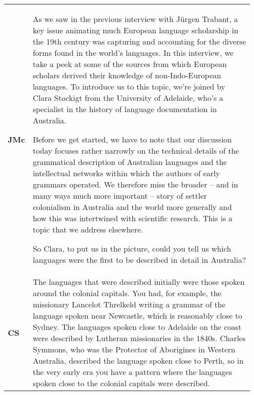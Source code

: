 \documentclass[12pt]{article}
\begin{document}
\begin{flushleft}
\tablefirsthead{}
\tablehead{}
\tabletail{}
\tablelasttail{}
\begin{supertabular}{m{0.24415985in}m{5.89766in}}
\textbf{JMc}\newline
 &
As we saw in the previous interview with Jürgen Trabant, a key issue animating much European language scholarship in the 19th century was capturing and accounting for the diverse forms found in the world’s languages. In this interview, we take a peek at some of the sources from which European scholars derived their knowledge of non-Indo-European languages. To introduce us to this topic, we’re joined by Clara Stockigt from the University of Adelaide, who’s a specialist in the history of language documentation in Australia. 

Before we get started, we have to note that our discussion today focuses rather narrowly on the technical details of the grammatical description of Australian languages and the intellectual networks within which the authors of early grammars operated. We therefore miss the broader – and in many ways much more important – story of settler colonialism in Australia and the world more generally and how this was intertwined with scientific research. This is a topic that we address elsewhere. 

So Clara, to put us in the picture, could you tell us which languages were the first to be described in detail in Australia?\\
\textbf{CS}\newline
 &
The languages that were described initially were those spoken around the colonial capitals. You had, for example, the missionary Lancelot Threlkeld writing a grammar of the language spoken near Newcastle, which is reasonably close to Sydney. The languages spoken close to Adelaide on the coast were described by Lutheran missionaries in the 1840s. Charles Symmons, who was the Protector of Aborigines in Western Australia, described the language spoken close to Perth, so in the very early era you have a pattern where the languages spoken close to the colonial capitals were described. 


\end{supertabular}
\end{flushleft}
\end{document}
